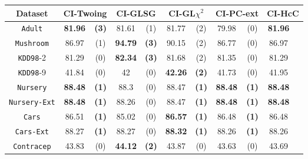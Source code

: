 \begin{table*}
\small
\centering
\begin{tabular}{c|cc|cc|cc|cc|cc} 
Dataset  &   \multicolumn{2}{c|}{CI-Twoing} &   \multicolumn{2}{c|}{CI-GLSG} & \multicolumn{2}{c|}{CI-GL$\chi^2$}& \multicolumn{2}{c|}{CI-PC-ext}& \multicolumn{2}{c}{CI-HcC} \\  \hline   
{\tt Adult}        &{\bf 81.96} &{\bf  (3)} & 81.61       & (1)       & 81.77       & (2)       & 79.98       & (0)       & {\bf 81.96} &           \\
{\tt Mushroom}     &86.97       & (1)       &{\bf  94.79 }& {\bf (3)} & 90.15       & (2)       & 86.77       & (0)       & 86.97       &           \\
{\tt KDD98}-2      &81.29       & (0)       & {\bf 82.34 }& {\bf (3) }& 81.68       & (2)       & 81.35       & (0)       & 81.29       &           \\
{\tt KDD98}-9      &41.84       & (0)       & 42          & (0)       & {\bf 42.26} & {\bf (2)} & 41.73       & (0)       & 41.95       &           \\
{\tt Nursery}      &{\bf 88.48} & {\bf (1)} & 88.3        & (0)       & 88.47       & {\bf (1)} &{\bf 88.48 } & {\bf (1)} & {\bf 88.48} &           \\
{\tt Nursery-Ext}  &{\bf 88.48} & {\bf (1)} & 88.26       & (0)       & 88.47       & {\bf (1)} &{\bf 88.48 } & {\bf (1)} & {\bf 88.48} &           \\
{\tt Cars}         &86.51       & {\bf (1)} & 85.02       & (0)       & {\bf 86.57} & {\bf (1)} & 86.48       & {\bf (1)} & 86.48       &           \\
{\tt Cars-Ext}     &88.27       & {\bf (1) }& 88.27       & (0)       & {\bf 88.32} & {\bf (1)} & 88.26       & {\bf (1)} & 88.26       &           \\
{\tt Contracep}    &43.83       & (0)       & {\bf 44.12} & {\bf (2)} & 43.87       & (0)       & 43.63       & (0)       & 43.69       &           \\

\end{tabular}
\end{table*}
